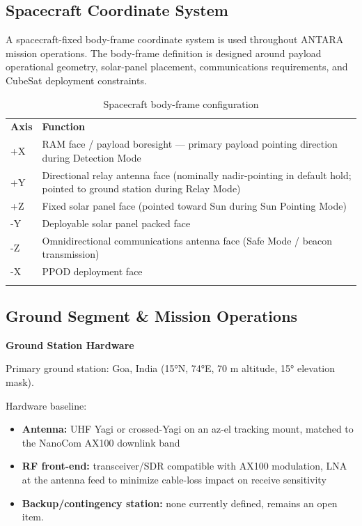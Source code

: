 \subsection{Spacecraft Coordinate System}

A spacecraft-fixed body-frame coordinate system is used throughout
ANTARA mission operations. The body-frame definition is designed around
payload operational geometry, solar-panel placement, communications
requirements, and CubeSat deployment constraints.

\begin{longtable}{@{}
  >{\raggedright\arraybackslash}p{}
  >{\raggedright\arraybackslash}p{}@{}}
\caption{Spacecraft body-frame configuration}\\
\toprule\noalign{}
\textbf{Axis} & \textbf{Function} \\
+X & RAM face / payload boresight --- primary payload pointing direction
during Detection Mode \\
+Y & Directional relay antenna face (nominally nadir-pointing in default
hold; pointed to ground station during Relay Mode) \\
+Z & Fixed solar panel face (pointed toward Sun during Sun Pointing Mode) \\
-Y & Deployable solar panel packed face \\
-Z & Omnidirectional communications antenna face (Safe Mode / beacon
transmission) \\
-X & PPOD deployment face \\
\midrule\noalign{}
\endhead
\bottomrule\noalign{}
\endlastfoot
\end{longtable}


\subsection{Ground Segment \& Mission Operations}

\textbf{Ground Station Hardware}

Primary ground station: Goa, India (15°N, 74°E, 70 m altitude, 15°
elevation mask).

Hardware baseline:

\begin{itemize}
\item
  \textbf{Antenna:} UHF Yagi or crossed-Yagi on an az-el tracking mount,
  matched to the NanoCom AX100 downlink band
\item
  \textbf{RF front-end:} transceiver/SDR compatible with AX100
  modulation, LNA at the antenna feed to minimize cable-loss impact on
  receive sensitivity
\item
  \textbf{Backup/contingency station:} none currently defined, remains
  an open item.
\end{itemize}

